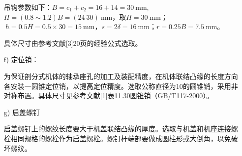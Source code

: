 \begin{itemize}
	\par 吊钩参数如下：$B=c_1+c_2=16+14=30~\mathrm{mm}$,$H=\left(0.8\sim 1.2\right)B=(24~30)~\mathrm{mm}$，取$H=30~\mathrm{mm}$；$\ h=0.5H=0.5\times 30=15~\mathrm{mm}$，$s=2\delta=16~\mathrm{mm}$；$r=0.25B=7.5~\mathrm{mm}$。 
	\par 具体尺寸由参考文献[3]20页的经验公式选取。
	\item[f)] 定位销：
	\par 为保证剖分式机体的轴承座孔的加工及装配精度，在机体联结凸缘的长度方向各安装一圆锥定位销，以提高定位精度。选取公称直径为10的圆锥销，采用非对称布置。具体尺寸见参考文献[1]表11.30圆锥销（GB/T117-2000）。
	\item[g)] 启盖螺钉
	\par 启盖螺钉上的螺纹长度要大于机盖联结凸缘的厚度。选取与机盖和机座连接螺栓相同规格的螺栓作为启盖螺栓。螺钉杆端部要做成圆柱形或大倒角，以免破坏螺纹。
\end{itemize}






